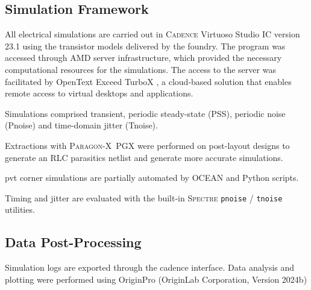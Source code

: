 \subsection{Simulation Framework}
All electrical simulations are carried out in \textsc{Cadence} Virtuoso Studio IC version 23.1 \cite{CadenceVirtuosoIC231ISR13} using the transistor models delivered by the foundry. The program was accessed through AMD server infrastructure, which provided the necessary computational resources for the simulations. The access to the server was facilitated by OpenText Exceed TurboX \cite{RedHatExceedTurboX}, a cloud-based solution that enables remote access to virtual desktops and applications.

Simulations comprised transient, periodic steady-state (PSS), periodic noise (Pnoise) and time-domain jitter (Tnoise).

Extractions with \textsc{Paragon-X}~PGX \cite{AnsysParagonX2025} were performed on post-layout designs to generate an RLC parasitics netlist and generate more accurate simulations.

\gls{pvt} corner simulations are partially automated by \textsc{OCEAN} and Python scripts.

Timing and jitter are evaluated with the built-in \textsc{Spectre} \texttt{pnoise} / \texttt{tnoise} utilities. 


\subsection{Data Post-Processing}
Simulation logs are exported through the cadence interface. Data analysis and plotting were performed using OriginPro (OriginLab Corporation, Version 2024b) \cite{OriginLab2025}
